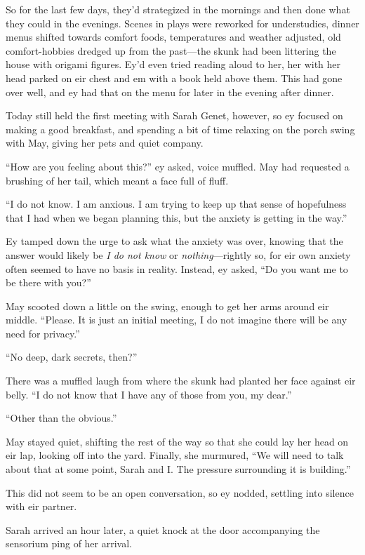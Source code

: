 So for the last few days, they'd strategized in the mornings and then done what they could in the evenings. Scenes in plays were reworked for understudies, dinner menus shifted towards comfort foods, temperatures and weather adjusted, old comfort-hobbies dredged up from the past—the skunk had been littering the house with origami figures. Ey'd even tried reading aloud to her, her with her head parked on eir chest and em with a book held above them. This had gone over well, and ey had that on the menu for later in the evening after dinner.

Today still held the first meeting with Sarah Genet, however, so ey focused on making a good breakfast, and spending a bit of time relaxing on the porch swing with May, giving her pets and quiet company.

``How are you feeling about this?'' ey asked, voice muffled. May had requested a brushing of her tail, which meant a face full of fluff.

``I do not know. I am anxious. I am trying to keep up that sense of hopefulness that I had when we began planning this, but the anxiety is getting in the way.''

Ey tamped down the urge to ask what the anxiety was over, knowing that the answer would likely be \emph{I do not know} or \emph{nothing}—rightly so, for eir own anxiety often seemed to have no basis in reality. Instead, ey asked, ``Do you want me to be there with you?''

May scooted down a little on the swing, enough to get her arms around eir middle. ``Please. It is just an initial meeting, I do not imagine there will be any need for privacy.''

``No deep, dark secrets, then?''

There was a muffled laugh from where the skunk had planted her face against eir belly. ``I do not know that I have any of those from you, my dear.''

``Other than the obvious.''

May stayed quiet, shifting the rest of the way so that she could lay her head on eir lap, looking off into the yard. Finally, she murmured, ``We will need to talk about that at some point, Sarah and I. The pressure surrounding it is building.''

This did not seem to be an open conversation, so ey nodded, settling into silence with eir partner.

Sarah arrived an hour later, a quiet knock at the door accompanying the sensorium ping of her arrival.

